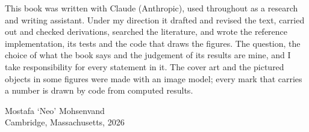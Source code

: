 This book was written with Claude (Anthropic), used throughout as a research and writing
assistant. Under my direction it drafted and revised the text, carried out and checked derivations, searched the
literature, and wrote the reference implementation, its tests and the code that draws the figures. The question,
the choice of what the book says and the judgement of its results are mine, and I take responsibility for every
statement in it. The cover art and the pictured objects in some figures were made with an image model; every mark
that carries a number is drawn by code from computed results.

\medskip
\noindent\hfill Mostafa \textquoteleft Neo\textquoteright{} Mohsenvand\\
\hspace*{\fill}Cambridge, Massachusetts, 2026

